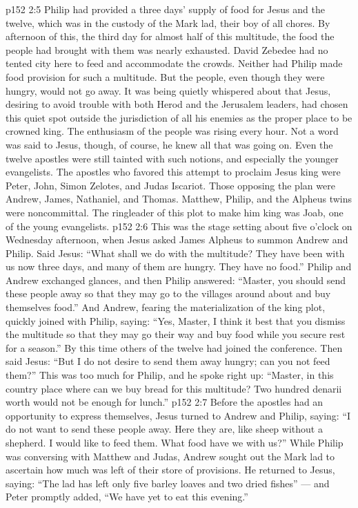 \vs p152 2:5 \pc Philip had provided a three days’ supply of food for Jesus and the twelve, which was in the custody of the Mark lad, their boy of all chores. By afternoon of this, the third day for almost half of this multitude, the food the people had brought with them was nearly exhausted. David Zebedee had no tented city here to feed and accommodate the crowds. Neither had Philip made food provision for such a multitude. But the people, even though they were hungry, would not go away. It was being quietly whispered about that Jesus, desiring to avoid trouble with both Herod and the Jerusalem leaders, had chosen this quiet spot outside the jurisdiction of all his enemies as the proper place to be crowned king. The enthusiasm of the people was rising every hour. Not a word was said to Jesus, though, of course, he knew all that was going on. Even the twelve apostles were still tainted with such notions, and especially the younger evangelists. The apostles who favored this attempt to proclaim Jesus king were Peter, John, Simon Zelotes, and Judas Iscariot. Those opposing the plan were Andrew, James, Nathaniel, and Thomas. Matthew, Philip, and the Alpheus twins were noncommittal. The ringleader of this plot to make him king was Joab, one of the young evangelists.
\vs p152 2:6 \pc This was the stage setting about five o’clock on Wednesday afternoon, when Jesus asked James Alpheus to summon Andrew and Philip. Said Jesus: \textcolor{ubdarkred}{“What shall we do with the multitude? They have been with us now three days, and many of them are hungry. They have no food.”} Philip and Andrew exchanged glances, and then Philip answered: “Master, you should send these people away so that they may go to the villages around about and buy themselves food.” And Andrew, fearing the materialization of the king plot, quickly joined with Philip, saying: “Yes, Master, I think it best that you dismiss the multitude so that they may go their way and buy food while you secure rest for a season.” By this time others of the twelve had joined the conference. Then said Jesus: \textcolor{ubdarkred}{“But I do not desire to send them away hungry; can you not feed them?”} This was too much for Philip, and he spoke right up: “Master, in this country place where can we buy bread for this multitude? Two hundred denarii worth would not be enough for lunch.”
\vs p152 2:7 Before the apostles had an opportunity to express themselves, Jesus turned to Andrew and Philip, saying: \textcolor{ubdarkred}{“I do not want to send these people away. Here they are, like sheep without a shepherd. I would like to feed them. What food have we with us?”} While Philip was conversing with Matthew and Judas, Andrew sought out the Mark lad to ascertain how much was left of their store of provisions. He returned to Jesus, saying: “The lad has left only five barley loaves and two dried fishes” --- and Peter promptly added, “We have yet to eat this evening.”
